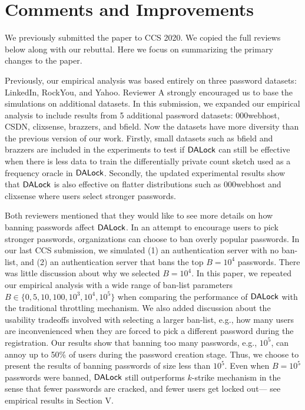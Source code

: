 \section{Comments and Improvements}

We previously submitted the paper to CCS 2020. We copied the full reviews below along with our rebuttal. Here we focus on summarizing the primary changes to the paper.

 Previously, our empirical analysis was based entirely on three password datasets: LinkedIn, RockYou, and Yahoo. Reviewer A strongly encouraged us to base the simulations on additional datasets. In this submission, we expanded our empirical analysis to include results from 5 additional password datasets: 000webhost, CSDN, clixsense, brazzers, and bfield. Now the datasets have more diversity than the previous version of our work. Firstly, small datasets such as bfield and brazzers are included in the experiments to test if $\mathsf{DALock}$ can still be effective when there is less data to train the differentially private count sketch used as a frequency oracle in $\mathsf{DALock}$. Secondly, the updated experimental results show that $\mathsf{DALock}$ is also effective on flatter distributions such as 000webhost and clixsense where users select stronger passwords.  

 Both reviewers mentioned that they would like to see more details on how banning passwords affect $\mathsf{DALock}$. In an attempt to encourage users to pick stronger passwords, organizations can choose to ban overly popular passwords. In our last CCS submission, we simulated (1) an authentication server with no ban-list, and (2) an authentication server that bans the top $B=10^4$ passwords. There was little discussion about why we selected $B=10^4$. In this paper, we repeated our empirical analysis with a wide range of ban-list parameters $B\in\{0,5,10,100, 10^3,10^4, 10^5\}$ when comparing the performance of $\mathsf{DALock}$ with the traditional throttling mechanism. We also added discussion about the usability tradeoffs involved with selecting a larger ban-list, e.g., how many users are inconvenienced when they are forced to pick a different password during the registration. Our results show that banning too many passwords, e.g., $10^5$, can annoy up to 50\% of users during the password creation stage. Thus, we choose to present the results of banning passwords of size less than $10^5$. Even when $B=10^5$ passwords were banned, $\mathsf{DALock}$ still outperforms $k$-strike mechanism in the sense that fewer passwords are cracked, and fewer users get locked out--- see empirical results in Section V. 


